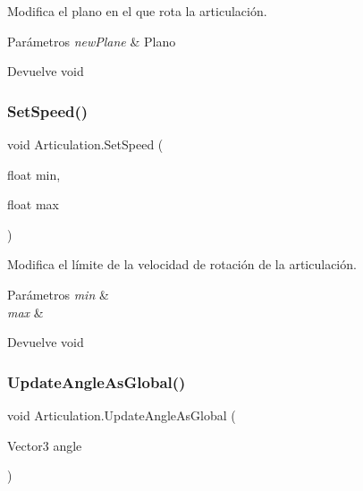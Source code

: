 Modifica el plano en el que rota la articulación. 
\begin{DoxyParams}{Parámetros}
{\em new\+Plane} & Plano \\
\hline
\end{DoxyParams}
\begin{DoxyReturn}{Devuelve}
void 
\end{DoxyReturn}
\mbox{\label{class_articulation_a6522fc73e75eb5953305d51fcae10466}} 
\subsubsection{\texorpdfstring{SetSpeed()}{SetSpeed()}}
{\footnotesize\ttfamily void Articulation.\+Set\+Speed (\begin{DoxyParamCaption}\item[{float}]{min,  }\item[{float}]{max }\end{DoxyParamCaption})\hspace{0.3cm}{\ttfamily [inline]}}

Modifica el límite de la velocidad de rotación de la articulación. 
\begin{DoxyParams}{Parámetros}
{\em min} & \\
\hline
{\em max} & \\
\hline
\end{DoxyParams}
\begin{DoxyReturn}{Devuelve}
void 
\end{DoxyReturn}
\mbox{\label{class_articulation_a94f0c8fac481b23ec71ac8c4cd8b0862}} 
\subsubsection{\texorpdfstring{UpdateAngleAsGlobal()}{UpdateAngleAsGlobal()}}
{\footnotesize\ttfamily void Articulation.\+Update\+Angle\+As\+Global (\begin{DoxyParamCaption}\item[{Vector3}]{angle }\end{DoxyParamCaption})\hspace{0.3cm}{\ttfamily [inline]}}

